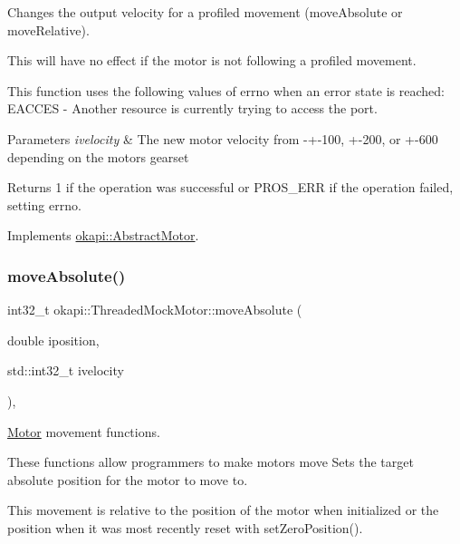 Changes the output velocity for a profiled movement (move\+Absolute or move\+Relative). 

This will have no effect if the motor is not following a profiled movement.

This function uses the following values of errno when an error state is reached\+: E\+A\+C\+C\+ES -\/ Another resource is currently trying to access the port.


\begin{DoxyParams}{Parameters}
{\em ivelocity} & The new motor velocity from -\/+-\/100, +-\/200, or +-\/600 depending on the motor\textquotesingle{}s gearset \\
\hline
\end{DoxyParams}
\begin{DoxyReturn}{Returns}
1 if the operation was successful or P\+R\+O\+S\+\_\+\+E\+RR if the operation failed, setting errno. 
\end{DoxyReturn}


Implements \mbox{\hyperlink{classokapi_1_1AbstractMotor_a1d131cbf0b8a325a54034e540c3be6d2}{okapi\+::\+Abstract\+Motor}}.

\mbox{\label{classokapi_1_1ThreadedMockMotor_a12c410b5a9fc55cfad4bc64f970da7be}} 
\subsubsection{\texorpdfstring{moveAbsolute()}{moveAbsolute()}}
{\footnotesize\ttfamily int32\+\_\+t okapi\+::\+Threaded\+Mock\+Motor\+::move\+Absolute (\begin{DoxyParamCaption}\item[{double}]{iposition,  }\item[{std\+::int32\+\_\+t}]{ivelocity }\end{DoxyParamCaption})\hspace{0.3cm}{\ttfamily [override]}, {\ttfamily [virtual]}}



\mbox{\hyperlink{classokapi_1_1Motor}{Motor}} movement functions. 

These functions allow programmers to make motors move Sets the target absolute position for the motor to move to.

This movement is relative to the position of the motor when initialized or the position when it was most recently reset with set\+Zero\+Position().

